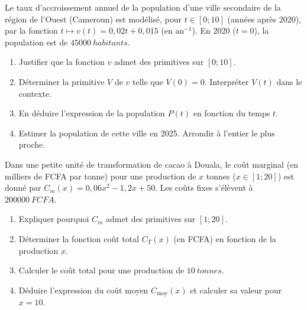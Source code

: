 \documentclass[11pt]{article}
\begin{document}
\begin{exercice}
Le taux d'accroissement annuel de la population d'une ville secondaire de la région de l'Ouest (Cameroun) est modélisé, pour $t \in [0; 10]$ (années après 2020), par la fonction $t \mapsto v(t) = 0,02t + 0,015$ (en $\text{an}^{-1}$). En 2020 ($t=0$), la population est de $\SI{45000}{habitants}$.
\begin{enumerate}
    \item Justifier que la fonction $v$ admet des primitives sur $[0; 10]$.
    \item Déterminer la primitive $V$ de $v$ telle que $V(0) = 0$. Interpréter $V(t)$ dans le contexte.
    \item En déduire l'expression de la population $P(t)$ en fonction du temps $t$.
    \item Estimer la population de cette ville en 2025. Arrondir à l'entier le plus proche.
\end{enumerate}
\end{exercice}

\begin{exercice}
Dans une petite unité de transformation de cacao à Douala, le coût marginal (en milliers de FCFA par tonne) pour une production de $x$ tonnes ($x \in [1; 20]$) est donné par $C_m(x) = 0,06x^2 - 1,2x + 50$. Les coûts fixes s'élèvent à $\SI{200000}{FCFA}$.
\begin{enumerate}
    \item Expliquer pourquoi $C_m$ admet des primitives sur $[1; 20]$.
    \item Déterminer la fonction coût total $C_T(x)$ (en FCFA) en fonction de la production $x$.
    \item Calculer le coût total pour une production de $\SI{10}{tonnes}$.
    \item Déduire l'expression du coût moyen $C_{\text{moy}}(x)$ et calculer sa valeur pour $x=10$.
\end{enumerate}
\end{exercice}
\end{document}
